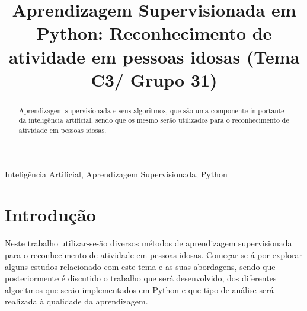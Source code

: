 \documentclass[conference]{IEEEtran}
\begin{document}
\title{Aprendizagem Supervisionada em Python: Reconhecimento de atividade em pessoas idosas (Tema C3/ Grupo 31)}

\author{
\and
{}
\and
{}
}


\maketitle

\begin{abstract}
Aprendizagem supervisionada e seus algoritmos, que são uma componente importante da inteligência artificial, sendo que os mesmo serão utilizados para o reconhecimento de atividade em pessoas idosas.
\end{abstract}

\begin{IEEEkeywords}
Inteligência Artificial, Aprendizagem Supervisionada, Python
\end{IEEEkeywords}

\section{Introdução}
Neste trabalho utilizar-se-ão diversos métodos de aprendizagem supervisionada para o reconhecimento de atividade em pessoas idosas. 
Começar-se-á por explorar alguns estudos relacionado com este tema e as suas abordagens, sendo que posteriormente é discutido o trabalho que será desenvolvido, dos diferentes algoritmos que serão implementados em Python e que tipo de análise será realizada à qualidade da aprendizagem.
 
\end{document}
